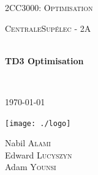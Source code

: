 \begin{titlepage}
\begin{center}


\LARGE \textsc{2CC3000: Optimisation}

\vspace{0.2cm}

\Large \textsc{CentraleSupélec - 2A}

\vspace{0.3cm}

\HRule \\[0.4cm]

{\huge \bfseries TD3 Optimisation\\
[0.2cm]}

\HRule \\[0.4cm]

\vspace{2cm}

\textsc{\today}

\vspace{2cm}

\texttt{[image: ./logo]}~\\[3cm]

\begin{minipage}{0.4\textwidth}
\begin{spacing}{1.125}
\begin{center}
    Nabil \textsc{Alami}\\
    Edward \textsc{Lucyszyn}\\
    Adam \textsc{Younsi}
\end{center}
\end{spacing}
\end{minipage}

\vfill

\end{center}
\end{titlepage}